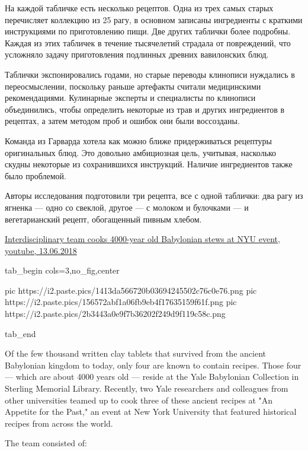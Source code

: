 \begin{itemize}
\begin{multicols}{2}
На каждой табличке есть несколько рецептов. Одна из трех самых старых
перечисляет коллекцию из 25 рагу, в основном записаны ингредиенты с краткими
инструкциями по приготовлению пищи. Две других таблички более подробны. Каждая
из этих табличек в течение тысячелетий страдала от повреждений, что усложняло
задачу приготовления подлинных древних вавилонских блюд.

Таблички экспонировались годами, но старые переводы клинописи нуждались в
переосмыслении, поскольку раньше артефакты считали медицинскими рекомендациями.
Кулинарные эксперты и специалисты по клинописи объединились, чтобы определить
некоторые из трав и других ингредиентов в рецептах, а затем методом проб и
ошибок они были воссозданы.

Команда из Гарварда хотела как можно ближе придерживаться рецептуры
оригинальных блюд. Это довольно амбициозная цель, учитывая, насколько скудны
некоторые из сохранившихся инструкций. Наличие ингредиентов также было
проблемой.

Авторы исследования подготовили три рецепта, все с одной таблички: два рагу из
ягненка — одно со свеклой, другое — с молоком и булочками — и вегетарианский
рецепт, обогащенный пивным хлебом.

\href{https://www.youtube.com/watch?v=qfqhJNUtiww}{%
Interdisciplinary team cooks 4000-year old Babylonian stews at NYU event, %
youtube, 13.06.2018%
}

\end{multicols}

\ifcmt
  tab_begin cols=3,no_fig,center

     pic https://i2.paste.pics/1413da566720b03694245502c76c0e76.png
		 pic https://i2.paste.pics/156572abf1a06fb9eb4f17635159f61f.png
		 pic https://i2.paste.pics/2b3443a0e9f7b36202f249d9f119c58c.png

  tab_end
\fi

\begin{multicols}{2}

Of the few thousand written clay tablets that survived from the ancient
Babylonian kingdom to today, only four are known to contain recipes. Those four
— which are about 4000 years old — reside at the Yale Babylonian Collection in
Sterling Memorial Library. Recently, two Yale researchers and colleagues from
other universities teamed up to cook three of these ancient recipes at "An
Appetite for the Past," an event at New York University that featured
historical recipes from across the world.

The team consisted of:


\end{multicols}
\end{itemize}
